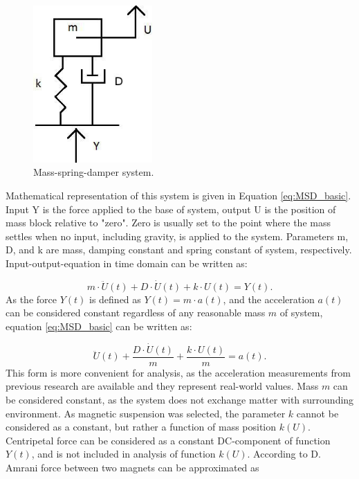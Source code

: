 \begin{figure}[htb]
\begin{center}
\includegraphics[height=6cm]{images/own_dwg/MSD.jpg}
\end{center}
\caption{\label{MSD} Mass-spring-damper system.}
\end{figure}

Mathematical representation of this system is given in Equation \eqref{eq:MSD_basic}. Input Y is the force applied to the base of system, output U is the position of mass block relative to "zero". Zero is usually set to the point where the mass settles when no input, including gravity, is applied to the system. Parameters m, D, and k are mass, damping constant and spring constant of system, respectively. Input-output-equation in time domain can be written as: 

\begin{equation}\label{eq:MSD_basic}
  m \cdot \ddot{U}(t) + D \cdot \dot{U}(t) + k \cdot U(t) = Y(t). 
\end{equation}
As the force $ Y(t) $ is defined as $ Y(t) = m \cdot a(t) $, and the acceleration $ a(t)$ can be considered constant regardless of any reasonable mass $ m $ of system, equation \eqref{eq:MSD_basic} can be written as:

\begin{equation}\label{eq:MSD_acceleration}
 \ddot{U}(t) + \frac{D \cdot \dot{U}(t)}{m} + \frac{k \cdot U(t)}{m} = a(t). 
\end{equation}
This form is more convenient for analysis, as the acceleration measurements from previous research are available and they represent real-world values. Mass $m$ can be considered constant, as the system does not exchange matter with surrounding environment. As magnetic suspension was selected, the parameter $k$ cannot be considered as a constant, but rather a function of mass position $k(U)$. Centripetal force can be considered as a constant DC-component of function $Y(t)$, and is not included in analysis of function $k(U)$. According to D. Amrani \cite{Amrani2015} force between two magnets can be approximated as

